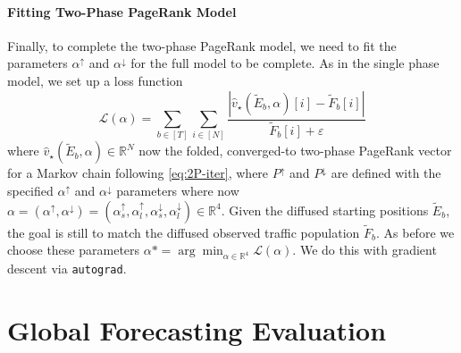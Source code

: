 \documentclass[sigconf, review]{acmart}
\newcommand{\R}{\mathbb{R}}
\begin{document}
\paragraph{Fitting Two-Phase PageRank Model}
Finally, to complete the two-phase PageRank model, we need to fit the parameters $\alpha^\uparrow$ and $\alpha^\downarrow$ for the full model to be complete.  %
As in the single phase model, we set up a loss function 
\[
\mathcal{L}(\alpha) = \sum_{b \in [T]} \sum_{i \in [N]} \frac{| \hat v_\star(\tilde E_b, \alpha)[i] - \tilde F_b[i]| }{\tilde F_b[i] + \varepsilon}
\]
where $\hat v_\star(\tilde E_b, \alpha) \in \R^N$ now the folded, converged-to two-phase PageRank vector for a Markov chain following \eqref{eq:2P-iter}, where $P^\uparrow$ and $P^\downarrow$ are defined with the specified $\alpha^\uparrow$ and $\alpha^\downarrow$ parameters where now $\alpha = (\alpha^\uparrow,\alpha^\downarrow) = (\alpha_s^\uparrow,\alpha_l^\uparrow,\alpha_s^\downarrow,\alpha_l^\downarrow) \in \R^4$.  
Given the diffused starting positions $\tilde E_b$, the goal is still to match the diffused observed traffic population $\tilde F_b$.  As before we choose these parameters $\alpha* = \arg \min_{\alpha \in \R^4} \mathcal{L}(\alpha)$.  We do this with gradient descent via \texttt{autograd}.  




\section{Global Forecasting Evaluation}
\label{sec:global-forecast}
\end{document}
